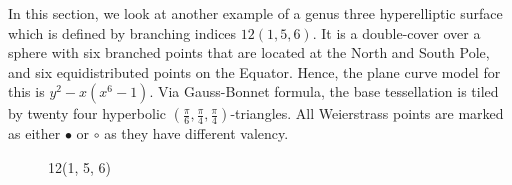 \documentclass[12pt,reqno]{amsart}
\newtheorem{lemma}[theorem]{Lemma}
\theoremstyle{definition}
\theoremstyle{remark}
\begin{document}
In this section, we look at another example of a genus three hyperelliptic surface which is defined by branching indices $12(1, 5, 6).$ It is a double-cover over a sphere with six branched points that are located at the North and South Pole, and six equidistributed points on the Equator. Hence, the plane curve model for this is $y^2 - x (x^6 - 1).$ Via Gauss-Bonnet formula, the base tessellation is tiled by twenty four hyperbolic $(\frac{\pi}{6}, \frac{\pi}{4}, \frac{\pi}{4})$-triangles. All Weierstrass points are marked as either $\bullet$ or $\circ$ as they have different valency.

\begin{figure}[htbp]
    \centering
    \qquad
    \caption{12(1, 5, 6)}%
    \label{fig:156}%
\end{figure}


\end{document}
